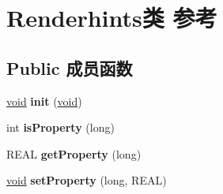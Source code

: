 \hypertarget{class_renderhints}{}\section{Renderhints类 参考}
\label{class_renderhints}
\subsection*{Public 成员函数}
\begin{DoxyCompactItemize}
\item 
\mbox{\label{class_renderhints_af449244d5bf33dbdfd96226215fa32e8}} 
\hyperlink{interfacevoid}{void} {\bfseries init} (\hyperlink{interfacevoid}{void})
\item 
\mbox{\label{class_renderhints_abb604510dd38ca44b0bdb6217f25d1c8}} 
int {\bfseries is\+Property} (long)
\item 
\mbox{\label{class_renderhints_a6b130b2efc2d243bb1c27640ab5eedd4}} 
R\+E\+AL {\bfseries get\+Property} (long)
\item 
\mbox{\label{class_renderhints_a325b98b8b24eee583453a17f9c2dfcd5}} 
\hyperlink{interfacevoid}{void} {\bfseries set\+Property} (long, R\+E\+AL)
\end{DoxyCompactItemize}
